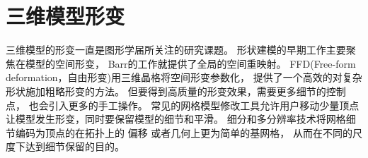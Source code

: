 \section{三维模型形变}
三维模型的形变一直是图形学届所关注的研究课题。
形状建模的早期工作主要聚焦在模型的空间形变，
Barr的工作\cite{barr1984global}就提供了全局的空间重映射。
FFD(Free-form deformation，自由形变)\cite{sederberg1986free}用三维晶格将空间形变参数化，
提供了一个高效的对复杂形状施加粗略形变的方法。
但要得到高质量的形变效果，需要更多细节的控制点\cite{coquillart1990extended}，
也会引入更多的手工操作。
常见的网格模型修改工具允许用户移动少量顶点让模型发生形变，同时要保留模型的细节和平滑。
细分和多分辨率技术将网格细节编码为顶点的在拓扑上的
偏移\cite{zorin1997interactive}\cite{kobbelt2000multiresolution}
或者几何上更为简单的基网格\cite{kobbelt1998interactive}，
从而在不同的尺度下达到细节保留的目的。